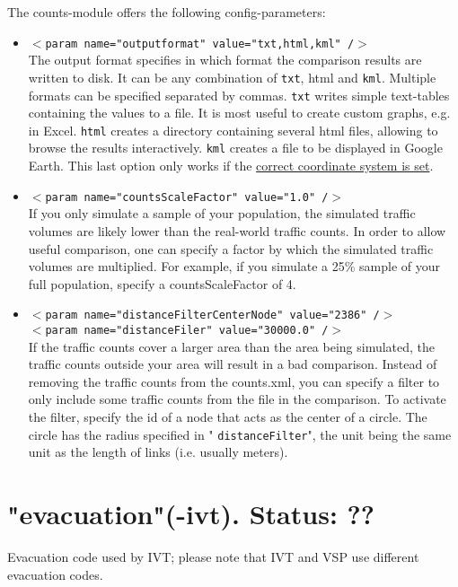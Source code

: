 \documentclass[a4paper,11pt]{report}
\begin{document}
The counts-module offers the following config-parameters:
\begin{itemize}
	\item 
\texttt{$<$param name="outputformat" value="txt,html,kml" /$>$}
\\     The output format specifies in which format the comparison results are written to disk. It can be any combination of 
\texttt{txt}, html and 
\texttt{kml}. Multiple formats can be specified separated by commas. 
\texttt{txt} writes simple text-tables containing the values to a file. It is most useful to create custom graphs, e.g. in Excel. 
\texttt{html} creates a directory containing several html files, allowing to browse the results interactively. 
\texttt{kml} creates a file to be displayed in Google Earth. This last option only works if the \href{http://www.matsim.org/node/405}{correct coordinate system is set}.
	\item 
\texttt{$<$param name="countsScaleFactor" value="1.0" /$>$}
\\     If you only simulate a sample of your population, the simulated  traffic volumes are likely lower than the real-world traffic counts. In  order to allow useful comparison, one can specify a factor by which the  simulated traffic volumes are multiplied. For example, if you simulate a  25\% sample of your full population, specify a countsScaleFactor  of 4.
	\item 
\texttt{$<$param name="distanceFilterCenterNode" value="2386" /$>$
\\     $<$param name="distanceFiler" value="30000.0" /$>$}
\\     If the traffic counts cover a larger area than the area being  simulated, the traffic counts outside your area will result in a bad  comparison. Instead of removing the traffic counts from the counts.xml,  you can specify a filter to only include some traffic counts from the  file in the comparison. To activate the filter, specify the id of a node  that acts as the center of a circle. The circle has the radius  specified in "
\texttt{distanceFilter}", the unit being the same unit as the length of links (i.e. usually meters).
\end{itemize}



\vfill\eject
\section{"evacuation"(-ivt). Status: ??}

Evacuation code used by IVT; please note that IVT and VSP use different evacuation codes.
\end{document}
